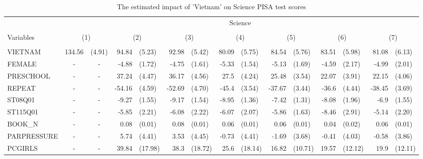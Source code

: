 \documentclass[10pt]{article}
\begin{document}
	
	\begin{table}[htbp]
		\footnotesize
		\def\arraystretch{1}
		\def\tabcolsep{4}
		\centering
		\caption{The estimated impact of 'Vietnam' on Science PISA test scores}
		\begin{tabular}{lrlrlrlrlrlrlrl}
			\toprule
			\midrule
			& \multicolumn{14}{c}{Science} \\
			\cline{2-15} \\
			Variables & \multicolumn{2}{c}{(1)} & \multicolumn{2}{c}{(2)} & \multicolumn{2}{c}{(3)} & \multicolumn{2}{c}{(4)} & \multicolumn{2}{c}{(5)} & \multicolumn{2}{c}{(6)} & \multicolumn{2}{c}{(7)} \\
			\hline\\ 

    VIETNAM & 134.56 & (4.91) & 94.84 & (5.23) & 92.98 & (5.42) & 80.09 & (5.75) & 84.54 & (5.76) & 83.51 & (5.98) & 81.08 & (6.13) \\[0.2em]
    FEMALE & \multicolumn{1}{c}{-} & \multicolumn{1}{c}{-} & -4.88 & (1.72) & -4.75 & (1.61) & -5.33 & (1.54) & -5.13 & (1.69) & -4.59 & (2.17) & -4.99 & (2.01) \\[0.2em]
    PRESCHOOL & \multicolumn{1}{c}{-} & \multicolumn{1}{c}{-} & 37.24 & (4.47) & 36.17 & (4.56) & 27.5  & (4.24) & 25.48 & (3.54) & 22.07 & (3.91) & 22.15 & (4.06) \\[0.2em]
    REPEAT & \multicolumn{1}{c}{-} & \multicolumn{1}{c}{-} & -54.16 & (4.59) & -52.69 & (4.70) & -45.4 & (3.54) & -37.67 & (3.44) & -36.6 & (4.44) & -38.45 & (3.69) \\[0.2em]
    ST08Q01 & \multicolumn{1}{c}{-} & \multicolumn{1}{c}{-} & -9.27 & (1.55) & -9.17 & (1.54) & -8.95 & (1.36) & -7.42 & (1.31) & -8.08 & (1.96) & -6.9  & (1.55) \\[0.2em]
    ST115Q01 & \multicolumn{1}{c}{-} & \multicolumn{1}{c}{-} & -5.85 & (2.21) & -6.08 & (2.22) & -6.07 & (2.07) & -5.86 & (1.63) & -8.46 & (2.91) & -5.14 & (2.20) \\[0.2em]
    BOOK\_N & \multicolumn{1}{c}{-} & \multicolumn{1}{c}{-} & 0.08  & (0.01) & 0.08  & (0.01) & 0.06  & (0.01) & 0.06  & (0.01) & 0.04  & (0.02) & 0.06  & (0.01) \\[0.2em]
    PARPRESSURE & \multicolumn{1}{c}{-} & \multicolumn{1}{c}{-} & 5.74  & (4.41) & 3.53  & (4.45) & -0.73 & (4.41) & -1.69 & (3.68) & -0.41 & (4.03) & -0.58 & (3.86) \\[0.2em]
    PCGIRLS & \multicolumn{1}{c}{-} & \multicolumn{1}{c}{-} & 39.84 & (17.98) & 38.3  & (18.72) & 25.6  & (18.14) & 16.82 & (10.71) & 19.57 & (12.12) & 19.9  & (12.11) \\[0.2em]

\end{tabular}
\end{table}
\end{document}
